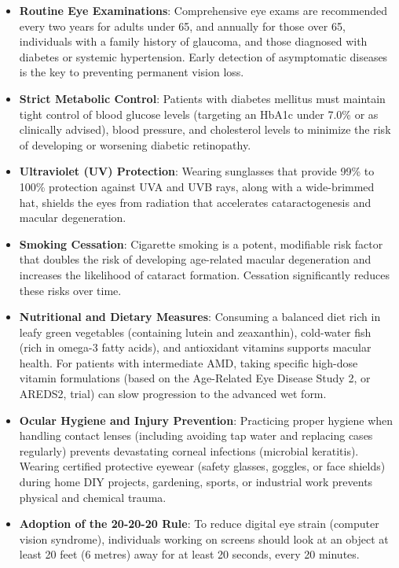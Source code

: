 \begin{itemize}
    \item \textbf{Routine Eye Examinations}: Comprehensive eye exams are recommended every two years for adults under 65, and annually for those over 65, individuals with a family history of glaucoma, and those diagnosed with diabetes or systemic hypertension. Early detection of asymptomatic diseases is the key to preventing permanent vision loss.
    \item \textbf{Strict Metabolic Control}: Patients with diabetes mellitus must maintain tight control of blood glucose levels (targeting an HbA1c under 7.0\% or as clinically advised), blood pressure, and cholesterol levels to minimize the risk of developing or worsening diabetic retinopathy.
    \item \textbf{Ultraviolet (UV) Protection}: Wearing sunglasses that provide 99\% to 100\% protection against UVA and UVB rays, along with a wide-brimmed hat, shields the eyes from radiation that accelerates cataractogenesis and macular degeneration.
    \item \textbf{Smoking Cessation}: Cigarette smoking is a potent, modifiable risk factor that doubles the risk of developing age-related macular degeneration and increases the likelihood of cataract formation. Cessation significantly reduces these risks over time.
    \item \textbf{Nutritional and Dietary Measures}: Consuming a balanced diet rich in leafy green vegetables (containing lutein and zeaxanthin), cold-water fish (rich in omega-3 fatty acids), and antioxidant vitamins supports macular health. For patients with intermediate AMD, taking specific high-dose vitamin formulations (based on the Age-Related Eye Disease Study 2, or AREDS2, trial) can slow progression to the advanced wet form.
    \item \textbf{Ocular Hygiene and Injury Prevention}: Practicing proper hygiene when handling contact lenses (including avoiding tap water and replacing cases regularly) prevents devastating corneal infections (microbial keratitis). Wearing certified protective eyewear (safety glasses, goggles, or face shields) during home DIY projects, gardening, sports, or industrial work prevents physical and chemical trauma.
    \item \textbf{Adoption of the 20-20-20 Rule}: To reduce digital eye strain (computer vision syndrome), individuals working on screens should look at an object at least 20 feet (6 metres) away for at least 20 seconds, every 20 minutes.
\end{itemize}


